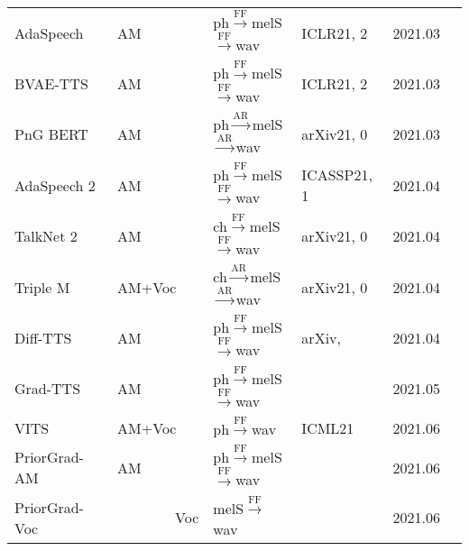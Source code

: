 \documentclass{article}
\begin{document}
\begin{center}
\begin{longtable}{l | l | l | l | l | l }
		AdaSpeech~\cite{chen2021adaspeech}            & AM       &{\color{blue}ph}$\stackrel{\text{FF}}{\longrightarrow}${\color{red}melS}$\stackrel{\text{FF}}{\longrightarrow}$wav     & ICLR21, 2 & 2021.03        \\
		BVAE-TTS~\cite{lee2020bidirectional}            & AM       &{\color{blue}ph}$\stackrel{\text{FF}}{\longrightarrow}${\color{red}melS}$\stackrel{\text{FF}}{\longrightarrow}$wav     & ICLR21, 2 & 2021.03        \\
		PnG BERT~\cite{jia2021png}            & AM       &{\color{blue}ph}$\stackrel{\text{AR}}{\longrightarrow}${\color{red}melS}$\stackrel{\text{AR}}{\longrightarrow}$wav     & arXiv21, 0 & 2021.03        \\
        AdaSpeech 2~\cite{yan2021adaspeech}           & AM       &{\color{blue}ph}$\stackrel{\text{FF}}{\longrightarrow}${\color{red}melS}$\stackrel{\text{FF}}{\longrightarrow}$wav     & ICASSP21, 1 & 2021.04        \\
        TalkNet 2~\cite{beliaev2021talknet}              & AM       &  {\color{blue}ch}$\stackrel{\text{FF}}{\longrightarrow}${\color{red}melS}$\stackrel{\text{FF}}{\longrightarrow}$wav             &arXiv21, 0& 2021.04     \\
        Triple M~\cite{lin2021triple}      & AM+Voc       &  {\color{blue}ch}$\stackrel{\text{AR}}{\longrightarrow}${\color{red}melS}$\stackrel{\text{AR}}{\longrightarrow}$wav             &arXiv21, 0& 2021.04     \\
		Diff-TTS~\cite{jeong2021diff}            & AM       &{\color{blue}ph}$\stackrel{\text{FF}}{\longrightarrow}${\color{red}melS}$\stackrel{\text{FF}}{\longrightarrow}$wav     & arXiv, & 2021.04        \\
		Grad-TTS~\cite{popov2021grad}            & AM       &{\color{blue}ph}$\stackrel{\text{FF}}{\longrightarrow}${\color{red}melS}$\stackrel{\text{FF}}{\longrightarrow}$wav     &  & 2021.05        \\
		VITS~\cite{kim2021conditional} & AM+Voc       &{\color{blue}ph}$\stackrel{\text{FF}}{\longrightarrow}$wav  & ICML21 & 2021.06 \\
		PriorGrad-AM~\cite{lee2021priorgrad}            & AM       &{\color{blue}ph}$\stackrel{\text{FF}}{\longrightarrow}${\color{red}melS}$\stackrel{\text{FF}}{\longrightarrow}$wav     &  & 2021.06        \\
		PriorGrad-Voc~\cite{lee2021priorgrad}               & ~~~~~~~~Voc      & {\color{red}melS}$\stackrel{\text{FF}}{\longrightarrow}$wav   &  & 2021.06         \\
		\bottomrule
\end{longtable}
\end{center}

\fi





%


\end{document}
